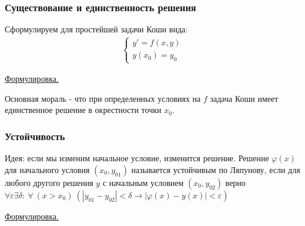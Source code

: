 \subsubsection{Существование и единственность решения}
Сформулируем для простейшей задачи Коши вида:
\begin{align*}
	\begin{cases}
		y' = f(x, y)\\
		y(x_0) = y_0 
	\end{cases}
\end{align*}

\href{http://twt.mpei.ac.ru/math/ode/odef/ODEf_04070000.html}{Формулировка.}

Основная мораль - что при определенных условиях на $f$ задача Коши имеет единственное решение в окрестности точки $x_0$. 

\subsubsection{Устойчивость}
Идея: если мы изменим начальное условие, изменится решение. Решение $\varphi(x)$ для начального условия $(x_0, y_{01})$ называется устойчивым по Ляпунову, если для любого другого решения $y$ с начальным условием $(x_0, y_{02})$ верно $\forall \varepsilon \exists \delta:\ \forall\ (x > x_0)\  (|y_{01} - y_{02}| < \delta \rightarrow |\varphi(x) - y(x)| < \varepsilon)$

\href{http://twt.mpei.ac.ru/math/ode/odef/ODEf_04100000.html}{Формулировка.} 

